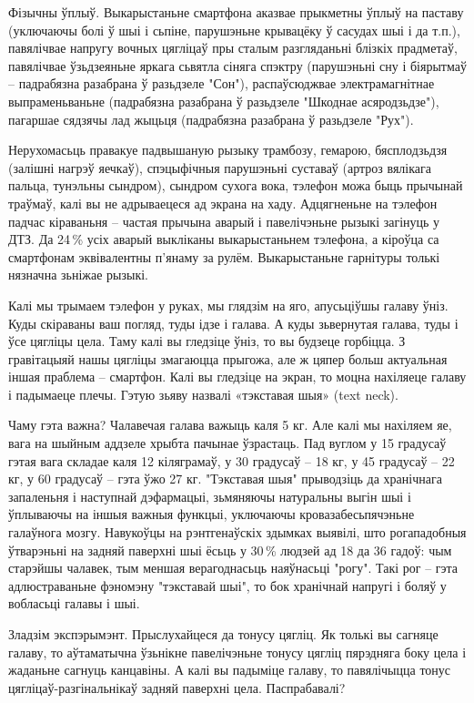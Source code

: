 Фізычны ўплыў. Выкарыстаньне смартфона аказвае прыкметны ўплыў на паставу (уключаючы болі ў шыі і сьпіне, парушэньне крывацёку ў сасудах шыі і да т.п.), павялічвае напругу вочных цягліцаў пры сталым разгляданьні блізкіх прадметаў, павялічвае ўзьдзеяньне яркага сьвятла сіняга спэктру (парушэньні сну і біярытмаў – падрабязна разабрана ў разьдзеле "Сон"), распаўсюджвае электрамагнітнае выпраменьваньне (падрабязна разабрана ў разьдзеле "Шкоднае асяродзьдзе"), пагаршае сядзячы лад жыцьця (падрабязна разабрана ў разьдзеле "Рух").

Нерухомасьць правакуе падвышаную рызыку трамбозу, гемарою, бясплодзьдзя (залішні нагрэў яечкаў), спэцыфічныя парушэньні суставаў (артроз вялікага пальца, тунэльны сындром), сындром сухога вока, тэлефон можа быць прычынай траўмаў, калі вы не адрываецеся ад экрана на хаду. Адцягненьне на тэлефон падчас кіраваньня – частая прычына аварый і павелічэньне рызыкі загінуць у ДТЗ. Да 24\,\% усіх аварый выкліканы выкарыстаньнем тэлефона, а кіроўца са смартфонам эквівалентны п'янаму за рулём. Выкарыстаньне гарнітуры толькі нязначна зьніжае рызыкі.

Калі мы трымаем тэлефон у руках, мы глядзім на яго, апусьціўшы галаву ўніз. Куды скіраваны ваш погляд, туды ідзе і галава. А куды зьвернутая галава, туды і ўсе цягліцы цела. Таму калі вы гледзіце ўніз, то вы будзеце горбіцца. З гравітацыяй нашы цягліцы змагаюцца прыгожа, але ж цяпер больш актуальная іншая праблема – смартфон. Калі вы гледзіце на экран, то моцна нахіляеце галаву і падымаеце плечы. Гэтую зьяву назвалі «тэкставая шыя» (text neck).

Чаму гэта важна? Чалавечая галава важыць каля 5 кг. Але калі мы нахіляем яе, вага на шыйным аддзеле хрыбта пачынае ўзрастаць. Пад вуглом у 15 градусаў гэтая вага складае каля 12 кіляграмаў, у 30 градусаў – 18 кг, у 45 градусаў – 22 кг, у 60 градусаў – гэта ўжо 27 кг. "Тэкставая шыя" прыводзіць да хранічнага запаленьня і наступнай дэфармацыі, зьмяняючы натуральны выгін шыі і ўплываючы на іншыя важныя функцыі, уключаючы кровазабесьпячэньне галаўнога мозгу. Навукоўцы на рэнтгенаўскіх здымках выявілі, што рогападобныя ўтварэньні на задняй паверхні шыі ёсьць у 30\,\% людзей ад 18 да 36 гадоў: чым старэйшы чалавек, тым меншая верагоднасьць наяўнасьці "рогу". Такі рог – гэта адлюстраваньне фэномэну "тэкставай шыі", то бок хранічнай напругі і боляў у вобласьці галавы і шыі.

Зладзім экспэрымэнт. Прыслухайцеся да тонусу цягліц. Як толькі вы сагняце галаву, то аўтаматычна ўзьнікне павелічэньне тонусу цягліц пярэдняга боку цела і жаданьне сагнуць канцавіны. А калі вы падыміце галаву, то павялічыцца тонус цягліцаў-разгінальнікаў задняй паверхні цела. Паспрабавалі?

